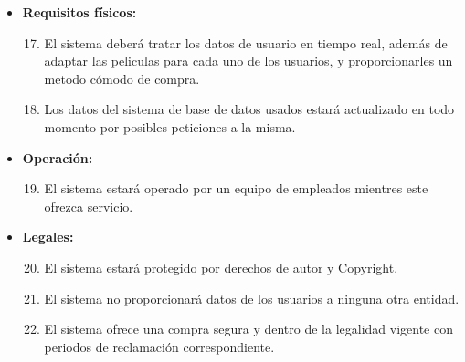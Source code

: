 \documentclass{article}
\begin{document}
\begin{itemize}
    \item \textbf{Requisitos físicos:}
        \begin{enumerate}[label=\bfseries RNF- \arabic*:]
        \setcounter{enumi}{16}
        \item El sistema deberá tratar los datos de usuario en tiempo real, además de adaptar las peliculas para cada uno de los usuarios, y proporcionarles un metodo cómodo de compra.
        \item Los datos del sistema de base de datos usados estará actualizado en todo momento por posibles peticiones a la misma.
        \end{enumerate}
        
    \item \textbf{Operación:}
        \begin{enumerate}[label=\bfseries RNF- \arabic*:]
        \setcounter{enumi}{18}
        \item El sistema estará operado por un equipo de empleados mientres este ofrezca servicio.
        \end{enumerate}
        
    \item \textbf{Legales:}
        \begin{enumerate}[label=\bfseries RNF- \arabic*:]
        \setcounter{enumi}{19}
        \item El sistema estará protegido por derechos de autor y Copyright.
        \item El sistema no proporcionará datos de los usuarios a ninguna otra entidad.
        \item El sistema ofrece una compra segura y dentro de la legalidad vigente con periodos de reclamación correspondiente.
        \end{enumerate}
    \end{itemize}
\end{document}
